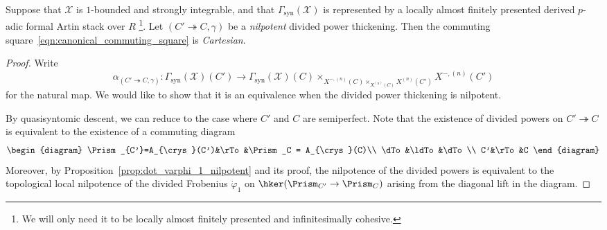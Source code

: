 \documentclass[10pt]{amsart}
\begin{document}
\begin{theorem}
\label{thm:groth_messing_mod_p}
Suppose that $\mathcal{X}$ is $1$-bounded and strongly integrable, and that $\Gamma_{\mathrm{syn}}(\mathcal{X})$ is represented by a locally almost finitely presented derived $p$-adic formal Artin stack over $R$ \footnote{We will only need it to be locally almost finitely presented and infinitesimally cohesive.}. Let $(C'\twoheadrightarrow C,\gamma)$ be a \emph{nilpotent} divided power thickening. Then the commuting square~\eqref{eqn:canonical_commuting_square} is \emph{Cartesian}.
\end{theorem}
\begin{proof}
Write
\[
\alpha_{(C'\twoheadrightarrow C,\gamma)}:\Gamma_{\mathrm{syn}}(\mathcal{X})(C')\to \Gamma_{\mathrm{syn}}(\mathcal{X})(C)\times_{X^{-,(n)}(C)\times_{X^{(n)}(C)}X^{(n)}(C')}X^{-,(n)}(C')
\]
for the natural map. We would like to show that it is an equivalence when the divided power thickening is nilpotent.

By quasisyntomic descent, we can reduce to the case where $C'$ and $C$ are semiperfect. Note that the existence of divided powers on $C'\twoheadrightarrow C$ is equivalent to the existence of a commuting diagram
\[
\begin{diagram}
\Prism_{C'}=A_{\crys}(C')&\rTo&\Prism_C = A_{\crys}(C)\\
\dTo&\ldTo&\dTo\\
C'&\rTo&C
\end{diagram}
\]
Moreover, by Proposition~\ref{prop:dot_varphi_1_nilpotent} and its proof, the nilpotence of the divided powers is equivalent to the topological local nilpotence of the divided Frobenius $\dot{\varphi}_1$ on $\hker(\Prism_{C'}\to \Prism_C)$ arising from the diagonal lift in the diagram.


\end{proof}
\end{document}
